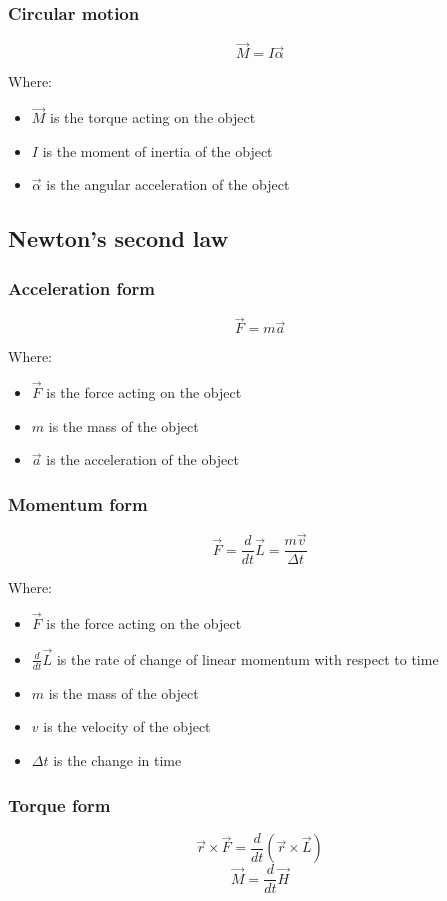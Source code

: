 \documentclass[11pt]{article}
\begin{document}
\subsubsection{Circular motion}
\label{sec:org752619d}
\[\vec{M} = I \vec{\alpha}\]

Where:
\begin{itemize}
\item \(\vec{M}\) is the torque acting on the object
\item \(I\) is the moment of inertia of the object
\item \(\vec{\alpha}\) is the angular acceleration of the object
\end{itemize}
\subsection{Newton's second law}
\label{sec:orgc2ca6be}

\subsubsection{Acceleration form}
\label{sec:org86398f0}
\[\vec{F} = m \vec{a}\]

Where:
\begin{itemize}
\item \(\vec{F}\) is the force acting on the object
\item \(m\) is the mass of the object
\item \(\vec{a}\) is the acceleration of the object
\end{itemize}
\subsubsection{Momentum form}
\label{sec:org0aec6d0}
\[\vec{F} = \frac{d}{dt} \vec{L} = \frac{m \vec{v}}{\Delta t}\]

Where:
\begin{itemize}
\item \(\vec{F}\) is the force acting on the object
\item \(\frac{d}{dt} \vec{L}\) is the rate of change of linear momentum with respect to time
\item \(m\) is the mass of the object
\item \(v\) is the velocity of the object
\item \(\Delta t\) is the change in time
\end{itemize}
\subsubsection{Torque form}
\label{sec:orgd22dada}
\[\vec{r} \times \vec{F} = \frac{d}{dt} \left(\vec{r} \times \vec{L} \right)\]
\[\vec{M} = \frac{d}{dt} \vec{H}\]
\end{document}
